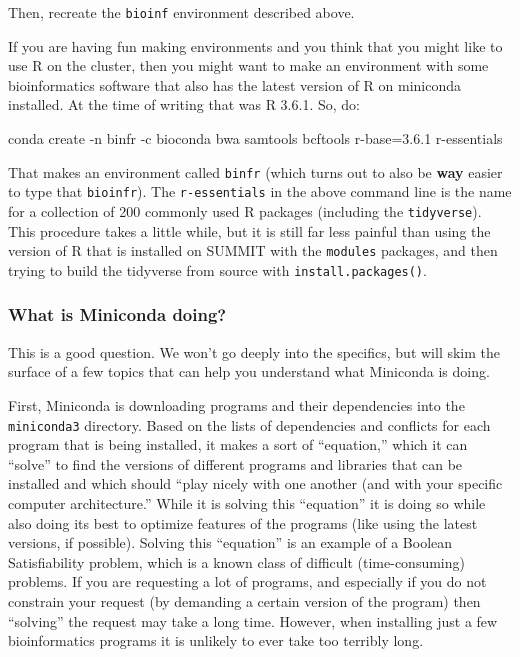 \documentclass[]{krantz}
\makeatletter
\newenvironment{Shaded}{\begin{snugshade}}{\end{snugshade}}
\newcommand{\ExtensionTok}[1]{#1}
\newcommand{\NormalTok}[1]{#1}
\newenvironment{kframe}{%
\medskip{}
\setlength{\fboxsep}{.8em}
 \def\at@end@of@kframe{}%
 \ifinner\ifhmode%
  \def\at@end@of@kframe{\end{minipage}}%
  \begin{minipage}{\columnwidth}%
 \fi\fi%
 \def\FrameCommand##1{\hskip\@totalleftmargin \hskip-\fboxsep
 \colorbox{shadecolor}{##1}\hskip-\fboxsep
     \hskip-\linewidth \hskip-\@totalleftmargin \hskip\columnwidth}%
 \MakeFramed {\advance\hsize-\width
   \@totalleftmargin\z@ \linewidth\hsize
   \@setminipage}}%
 {\par\unskip\endMakeFramed%
 \at@end@of@kframe}
\renewenvironment{Shaded}{\begin{kframe}}{\end{kframe}}
\makeatother
\begin{document}
Then, recreate the \texttt{bioinf} environment described above.

If you are having fun making environments and you think that you might like to use R on
the cluster, then you might want to make an environment with some bioinformatics software
that also has
the latest version of R on miniconda installed. At the time of writing that was R 3.6.1. So,
do:

\begin{Shaded}
\begin{Highlighting}[]
\ExtensionTok{conda}\NormalTok{ create -n binfr -c bioconda bwa samtools bcftools r-base=3.6.1 r-essentials}
\end{Highlighting}
\end{Shaded}

That makes an environment called \texttt{binfr} (which turns out to also be \textbf{way} easier to type that \texttt{bioinfr}).
The \texttt{r-essentials} in the above command line is the name for a collection of 200 commonly used R packages (including
the \texttt{tidyverse}). This procedure takes a little while, but it is still far less painful than using the
version of R that is installed on SUMMIT with the \texttt{modules} packages, and then trying to build the tidyverse
from source with \texttt{install.packages()}.

\hypertarget{what-is-miniconda-doing}{%
\subsubsection{What is Miniconda doing?}\label{what-is-miniconda-doing}}

This is a good question. We won't go deeply into the specifics, but will skim the
surface of a few topics that can help you understand what Miniconda is doing.

First, Miniconda is downloading programs and their dependencies into the \texttt{miniconda3}
directory. Based on the lists of dependencies and conflicts for each program that is being
installed, it makes a sort of ``equation,'' which it can ``solve'' to find the versions of
different programs and libraries that can be installed and which should ``play nicely with
one another (and with your specific computer architecture.'' While it is solving this
``equation'' it is doing so while also doing its best
to optimize features of the programs (like using the latest versions, if possible).
Solving this ``equation'' is an example of a Boolean Satisfiability problem, which is a known
class of difficult (time-consuming) problems. If you are requesting a lot of programs, and
especially if you do not constrain your request (by demanding a certain version of
the program) then ``solving'' the request may take a long time. However, when installing
just a few bioinformatics programs it is unlikely to ever take too terribly long.
\end{document}
